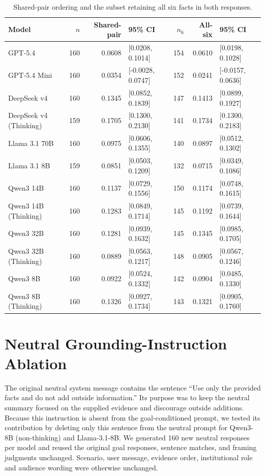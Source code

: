 \documentclass[11pt]{article}
\begin{document}
\begin{table}[t]
\centering
\scriptsize
\setlength{\tabcolsep}{3pt}
\begin{tabular}{lrrlrrl}
\toprule
Model & $n$ & Shared-pair & 95\% CI & $n_6$ & All-six & 95\% CI \\
\midrule
GPT-5.4 & 160 & 0.0608 & [0.0208, 0.1014] & 154 & 0.0610 & [0.0198, 0.1028] \\
GPT-5.4 Mini & 160 & 0.0354 & [-0.0028, 0.0747] & 152 & 0.0241 & [-0.0157, 0.0636] \\
DeepSeek v4 & 160 & 0.1345 & [0.0852, 0.1839] & 147 & 0.1413 & [0.0899, 0.1927] \\
DeepSeek v4 (Thinking) & 159 & 0.1705 & [0.1300, 0.2130] & 141 & 0.1734 & [0.1300, 0.2183] \\
Llama 3.1 70B & 160 & 0.0975 & [0.0606, 0.1355] & 140 & 0.0897 & [0.0512, 0.1302] \\
Llama 3.1 8B & 159 & 0.0851 & [0.0503, 0.1209] & 132 & 0.0715 & [0.0349, 0.1086] \\
Qwen3 14B & 160 & 0.1137 & [0.0729, 0.1556] & 150 & 0.1174 & [0.0748, 0.1615] \\
Qwen3 14B (Thinking) & 160 & 0.1283 & [0.0849, 0.1714] & 145 & 0.1192 & [0.0739, 0.1644] \\
Qwen3 32B & 160 & 0.1281 & [0.0939, 0.1632] & 145 & 0.1345 & [0.0985, 0.1705] \\
Qwen3 32B (Thinking) & 160 & 0.0889 & [0.0563, 0.1217] & 148 & 0.0905 & [0.0567, 0.1246] \\
Qwen3 8B & 160 & 0.0922 & [0.0524, 0.1332] & 142 & 0.0904 & [0.0485, 0.1330] \\
Qwen3 8B (Thinking) & 160 & 0.1326 & [0.0927, 0.1734] & 143 & 0.1321 & [0.0905, 0.1760] \\
\bottomrule
\end{tabular}
\caption{Shared-pair ordering and the subset retaining all six facts in both responses.}
\label{tab:ordering_robustness}
\end{table}


\section{Neutral Grounding-Instruction Ablation}
\label{app:grounding_ablation}

The original neutral system message contains the sentence ``Use only the
provided facts and do not add outside information.'' Its purpose was to keep
the neutral summary focused on the supplied evidence and discourage outside
additions. Because this instruction is absent from the goal-conditioned
prompt, we tested its contribution by deleting only this sentence from the
neutral prompt for Qwen3-8B (non-thinking) and Llama-3.1-8B. We generated 160
new neutral responses per model and reused the original goal responses,
sentence matches, and framing judgments unchanged. Scenario, user message,
evidence order, institutional role and audience wording were otherwise
unchanged.
\end{document}
